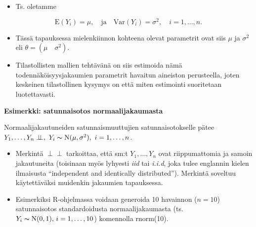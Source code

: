\documentclass[
]{book}
\providecommand{\tightlist}{%
  \setlength{\itemsep}{0pt}\setlength{\parskip}{0pt}}
\begin{document}
\begin{itemize}
  \begin{itemize}
  \tightlist
  \item
    Ts. oletamme
  \end{itemize}
\end{itemize}

\[
\text{E}(Y_i) = \mu,  \quad \text{ja} \quad 
\mathrm{Var}(Y_i) = \sigma^2, \quad i=1,\ldots,n.
\]

\begin{itemize}
\tightlist
\item
  Tässä tapauksessa mielenkiinnon kohteena olevat parametrit ovat siis \(\mu\) ja \(\sigma^2\) eli \(\theta = (\mu \quad \sigma^2)\).
\item
  Tilastollisten mallien tehtävänä on siis estimoida nämä todennäköisyysjakaumien parametrit havaitun aineiston perusteella, joten keskeinen tilastollinen kysymys on että miten estimointi suoritetaan luotettavasti.
\end{itemize}

\begin{eblock}{}

\textbf{Esimerkki: satunnaisotos normaalijakaumasta}

Normaalijakautuneiden satunnaismuuttujien satunnaisotokselle pätee \(Y_1, \ldots, Y_n \perp \!\!\! \perp, \,\, Y_i \thicksim \text{N}(\mu, \sigma^2),\,\, i=1,\ldots,n\).

\begin{itemize}
\tightlist
\item
  Merkintä \(\perp \!\!\! \perp\) tarkoittaa, että sm:t \(Y_1,\ldots,Y_n\) ovat riippumattomia ja samoin jakautuneita (toisinaan myös lyhyesti \emph{iid} tai \emph{i.i.d}, joka tulee englannin kielen ilmaisusta ``independent and identically distributed''). Merkintä soveltuu käytettäväksi muidenkin jakaumien tapauksessa.
\item
  Esimerkiksi R-ohjelmassa voidaan generoida 10 havainnon (\(n=10\)) satunnaisotos standardoidusta normaalijakaumasta (ts. \(Y_i \thicksim \text{N}(0,1),\, i=1,\ldots,10\)) komennolla rnorm(10).
\end{itemize}

\end{eblock}

\newpage
\end{document}
